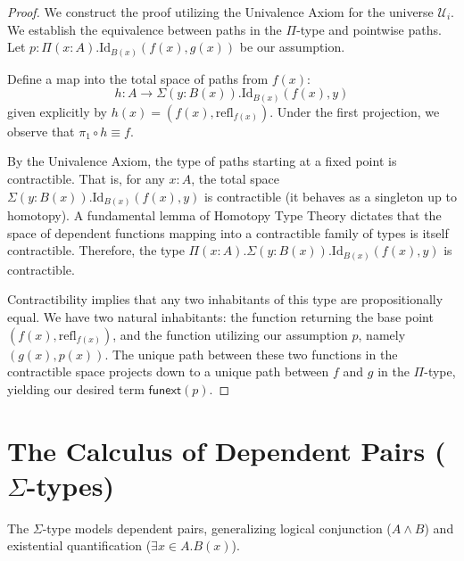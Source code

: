 \begin{proof}
We construct the proof utilizing the Univalence Axiom for the universe $\mathcal{U}_i$. We establish the equivalence between paths in the $\Pi$-type and pointwise paths. Let $p : \Pi(x:A).\mathrm{Id}_{B(x)}(f(x), g(x))$ be our assumption.

Define a map into the total space of paths from $f(x)$:
\[
h : A \to \Sigma(y:B(x)).\mathrm{Id}_{B(x)}(f(x), y)
\]
given explicitly by $h(x) = (f(x), \mathrm{refl}_{f(x)})$. Under the first projection, we observe that $\pi_1 \circ h \equiv f$.

By the Univalence Axiom, the type of paths starting at a fixed point is contractible. That is, for any $x : A$, the total space $\Sigma(y:B(x)).\mathrm{Id}_{B(x)}(f(x), y)$ is contractible (it behaves as a singleton up to homotopy). A fundamental lemma of Homotopy Type Theory dictates that the space of dependent functions mapping into a contractible family of types is itself contractible. Therefore, the type $\Pi(x:A).\Sigma(y:B(x)).\mathrm{Id}_{B(x)}(f(x), y)$ is contractible.

Contractibility implies that any two inhabitants of this type are propositionally equal. We have two natural inhabitants: the function returning the base point $(f(x), \mathrm{refl}_{f(x)})$, and the function utilizing our assumption $p$, namely $(g(x), p(x))$. The unique path between these two functions in the contractible space projects down to a unique path between $f$ and $g$ in the $\Pi$-type, yielding our desired term $\mathsf{funext}(p)$.
\end{proof}

\section{The Calculus of Dependent Pairs ($\Sigma$-types)}

The $\Sigma$-type models dependent pairs, generalizing logical conjunction ($A \land B$) and existential quantification ($\exists x{\in}A. B(x)$).

